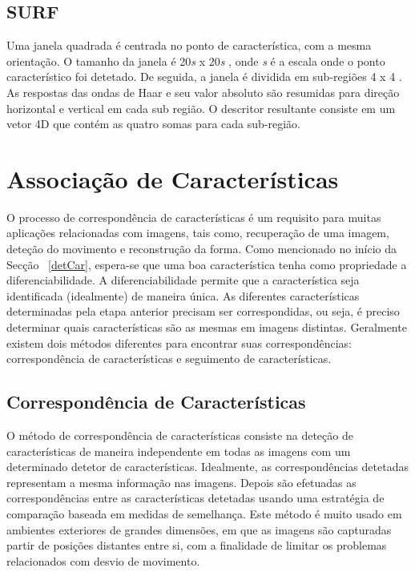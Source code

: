 \subsection{SURF}

Uma janela quadrada é centrada no ponto de característica, com a mesma orientação. O tamanho da janela é 20\textit{s} x 20\textit{s} , onde \textit{s} é a escala onde o ponto característico foi detetado. De seguida, a janela é dividida em sub-regiões 4 x 4 . As respostas das ondas de Haar e seu valor absoluto são resumidas para direção horizontal e vertical em cada sub região. O descritor resultante consiste em um vetor 4D que contém as quatro somas para cada sub-região.


\section{Associação de Características}

O processo de correspondência de características é um requisito para muitas aplicações relacionadas com imagens, tais como, recuperação de uma imagem, deteção do movimento e reconstrução da forma. 
Como mencionado no início da Secção ~\ref{detCar}, espera-se que uma boa característica tenha como propriedade a diferenciabilidade. A diferenciabilidade permite que a característica seja identificada (idealmente) de maneira única.
As diferentes características determinadas pela etapa anterior precisam ser correspondidas, ou seja, é preciso determinar quais características são as mesmas em imagens distintas. Geralmente existem dois métodos diferentes para encontrar suas correspondências: correspondência de características e seguimento de características. 


\subsection{Correspondência de Características}

O método de correspondência de características consiste na deteção de características de maneira independente em todas as imagens com um determinado detetor de características.
Idealmente, as correspondências detetadas representam a mesma informação nas imagens.
Depois são efetuadas as correspondências entre as características detetadas usando uma estratégia de comparação baseada em medidas de semelhança.
Este método é muito usado em ambientes exteriores de grandes dimensões, em que as imagens são capturadas partir de posições distantes entre si, com a finalidade de limitar os problemas relacionados com desvio de movimento.

